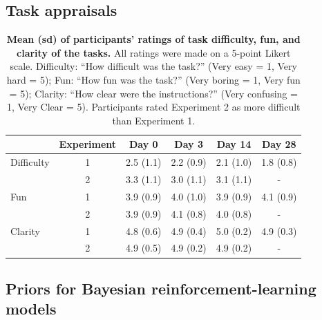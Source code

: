 \documentclass[a4paper,12pt]{article}
\begin{document}
\begin{refsection}[supp]
\clearpage
\subsection*{Task appraisals}

\begin{table}[h!]
    \centering
    \begin{tabular}{lccccc}
    \toprule
               & Experiment &   Day 0 &      Day 3 &     Day 14 &     Day 28 \\
    \midrule
    Difficulty &  1 &  2.5 (1.1) &  2.2 (0.9) &  2.1 (1.0) &  1.8 (0.8) \\
               &  2 &  3.3 (1.1) &  3.0 (1.1) &  3.1 (1.1) &          - \\
    \midrule
    Fun        &  1 &  3.9 (0.9) &  4.0 (1.0) &  3.9 (0.9) &  4.1 (0.9) \\
               &  2 &  3.9 (0.9) &  4.1 (0.8) &  4.0 (0.8) &          - \\
    \midrule
    Clarity    &  1 &  4.8 (0.6) &  4.9 (0.4) &  5.0 (0.2) &  4.9 (0.3) \\
               &  2 &  4.9 (0.5) &  4.9 (0.2) &  4.9 (0.2) &          - \\
    \bottomrule
    \end{tabular}
    \caption{{\bf Mean (sd) of participants' ratings of task difficulty, fun, and clarity of the tasks.} All ratings were made on a 5-point Likert scale. Difficulty: ``How difficult was the task?'' (Very easy = 1, Very hard = 5); Fun: ``How fun was the task?'' (Very boring = 1, Very fun = 5); Clarity: ``How clear were the instructions?'' (Very confusing = 1, Very Clear = 5). Participants rated Experiment 2 as more difficult than Experiment 1.}
    \label{tab:appraisals}
\end{table}

\clearpage
\subsection*{Priors for Bayesian reinforcement-learning models}


\end{refsection}
\end{document}
